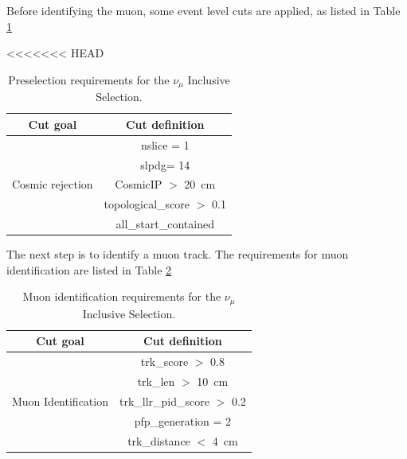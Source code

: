Before identifying the muon, some event level cuts are applied, as listed in Table \ref{tab:1muNp:preseInclusivel}

<<<<<<< HEAD
\begin{table}[h!]
\centering
\setlength{\tabcolsep}{10pt}
\renewcommand{\arraystretch}{1.25}
 \begin{tabular}{| c | c |} 
 \hline
 Cut goal & Cut definition \\
 \hline\hline
\multirow{5}{*}{ Cosmic rejection } & nslice = 1 \\ & slpdg= 14\\ &CosmicIP $>$ \SI{20}{\cm}\\
& topological\_score $>$ 0.1 \\ &all\_start\_contained\\
 \hline
 \end{tabular}
 \caption{\label{tab:1muNp:preseInclusivel} Preselection requirements for the $\nu_\mu$ Inclusive Selection.}
\end{table}

The next step is to identify a muon track. The requirements for muon identification are listed in Table \ref{tab:1muNp:preseInclusivelMuon}

\begin{table}[h!]
\centering
\setlength{\tabcolsep}{10pt}
\renewcommand{\arraystretch}{1.25}
 \begin{tabular}{| c | c |} 
 \hline
 Cut goal & Cut definition \\
 \hline\hline
\multirow{5}{*}{ Muon Identification } & 
trk\_score $>$ 0.8 \\ &
trk\_len $>$ \SI{10}{\cm} \\ &
trk\_llr\_pid\_score $>$ 0.2\\ &
pfp\_generation = 2  \\ &
trk\_distance $<$ \SI{4}{\cm}\\
 \hline
 \end{tabular}
 \caption{\label{tab:1muNp:preseInclusivelMuon} Muon identification requirements for the $\nu_\mu$ Inclusive Selection.}
\end{table}

